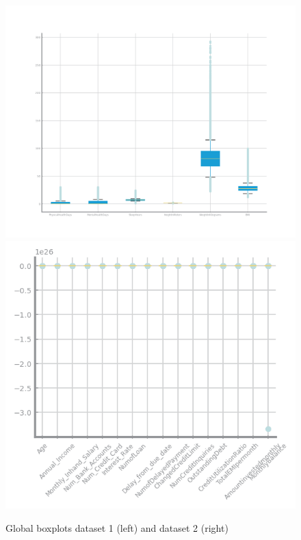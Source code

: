 \documentclass[10pt]{extarticle}
\begin{document}
\begin{figure}[H]
  \includegraphics[scale=0.50]{images/dataset1/data_profiling/CovidPos_global_boxplot.png}
  \centering\includegraphics[scale=0.5]{images/dataset2/data_profiling/Credit_Score_global_boxplot.png}
\caption{Global boxplots dataset 1 (left) and dataset 2 (right)}
\end{figure}
\end{document}
